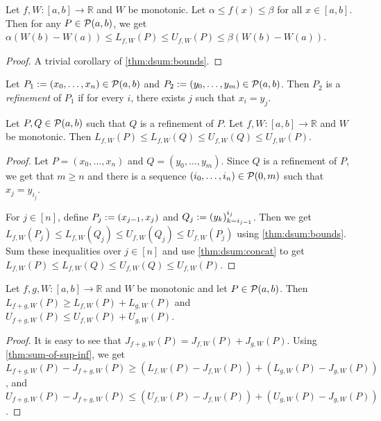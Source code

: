 \documentclass[a4paper,12pt,fleqn]{article}
\begin{document}
\begin{lemma}
\label{thm:dsum:bounds-simple}
Let $f, W: [a, b] \to \mathbb{R}$ and $W$ be monotonic.
Let $\alpha \le f(x) \le \beta$ for all $x \in [a, b]$.
Then for any $P \in \mathcal{P}(a, b)$, we get
$\alpha(W(b) - W(a)) \le L_{f,W}(P) \le U_{f,W}(P) \le \beta(W(b) - W(a))$.
\end{lemma}
\begin{proof}
A trivial corollary of \cref{thm:dsum:bounds}.
\end{proof}

\begin{definition}[Refinement]
\label{defn:refinement}
Let $P_1 := (x_0, \ldots, x_n) \in \mathcal{P}(a, b)$
and $P_2 := (y_0, \ldots, y_m) \in \mathcal{P}(a, b)$.
Then $P_2$ is a \emph{refinement} of $P_1$ if
for every $i$, there exists $j$ such that $x_i = y_j$.
\end{definition}

\begin{lemma}
\label{thm:dsum:refinement}
Let $P, Q \in \mathcal{P}(a, b)$ such that $Q$ is a refinement of $P$.
Let $f, W: [a, b] \to \mathbb{R}$ and $W$ be monotonic.
Then $L_{f,W}(P) \le L_{f,W}(Q) \le U_{f,W}(Q) \le U_{f,W}(P)$.
\end{lemma}
\begin{proof}
Let $P = (x_0, \ldots, x_n)$ and $Q = (y_0, \ldots, y_m)$.
Since $Q$ is a refinement of $P$, we get that $m \ge n$
and there is a sequence $(i_0, \ldots, i_n) \in \mathcal{P}(0, m)$ such that $x_j = y_{i_j}$.

For $j \in [n]$, define $P_j := (x_{j-1}, x_j)$ and $Q_j := (y_k)_{k=i_{j-1}}^{i_j}$.
Then we get $L_{f,W}(P_j) \le L_{f,W}(Q_j) \le U_{f,W}(Q_j) \le U_{f,W}(P_j)$
using \cref{thm:dsum:bounds}.
Sum these inequalities over $j \in [n]$ and use \cref{thm:dsum:concat} to get
$L_{f,W}(P) \le L_{f,W}(Q) \le U_{f,W}(Q) \le U_{f,W}(P)$.
\end{proof}

\begin{lemma}
\label{thm:dsum:sum}
Let $f, g, W: [a, b] \to \mathbb{R}$ and $W$ be monotonic and let $P \in \mathcal{P}(a, b)$.
Then $L_{f+g,W}(P) \ge L_{f,W}(P) + L_{g,W}(P)$
and $U_{f+g,W}(P) \le U_{f,W}(P) + U_{g,W}(P)$.
\end{lemma}
\begin{proof}
It is easy to see that $J_{f+g,W}(P) = J_{f,W}(P) + J_{g,W}(P)$.
Using \cref{thm:sum-of-sup-inf}, we get
$L_{f+g,W}(P) - J_{f+g,W}(P) \ge (L_{f,W}(P) - J_{f,W}(P)) + (L_{g,W}(P) - J_{g,W}(P))$,
and $U_{f+g,W}(P) - J_{f+g,W}(P) \le (U_{f,W}(P) - J_{f,W}(P)) + (U_{g,W}(P) - J_{g,W}(P))$.
\end{proof}
\end{document}
